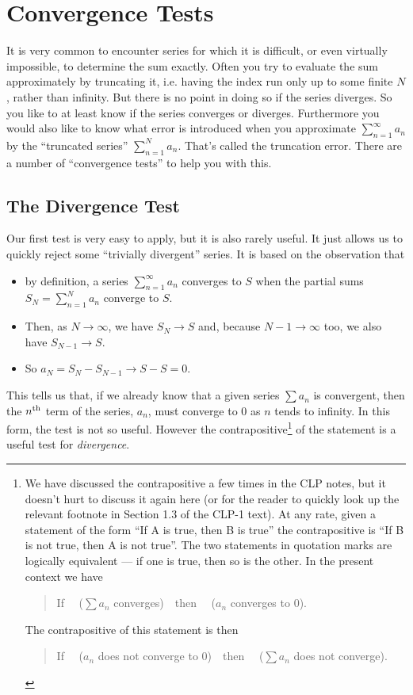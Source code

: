 \section{Convergence Tests}

It is very common to encounter series for which it is difficult, or even
virtually impossible, to determine the sum exactly. Often you try to evaluate
the sum approximately by truncating it, i.e. having the index run only
up to some finite $N$, rather than infinity. But there is no point in doing
so if the series diverges. So you like to at least know if the series converges
or diverges. Furthermore you would also like to know what error is introduced
when you approximate $\sum_{n=1}^\infty a_n$ by the ``truncated series''
$\sum_{n=1}^Na_n$. That's called the truncation error. There are a number
of ``convergence tests'' to help you with this.

\subsection{The Divergence Test}

Our first test is very easy to apply, but it is also rarely useful.
It just allows us to quickly reject some ``trivially divergent'' series.
It is based on the observation that
\begin{itemize}
\item  by definition, a series $\sum_{n=1}^\infty a_n$
converges to $S$ when the partial sums $S_N=\sum_{n=1}^N a_n$ converge
to  $S$.
\item Then, as $N\rightarrow\infty$, we have $S_N\rightarrow S$ and,
because $N-1\rightarrow\infty$ too, we also have $S_{N-1}\rightarrow S$.
\item
So $a_N=S_N-S_{N-1}\rightarrow S-S=0$.
\end{itemize}
This tells us that, if we already know that a given series $\sum a_n$
is convergent, then the $n^{\rm th}$ term of the series, $a_n$,
must converge to $0$ as $n$ tends to infinity. In this form,
the test is not so useful. However the
contrapositive\footnote{We have discussed the contrapositive a few times
in the CLP notes, but it doesn't hurt to discuss it again here (or for
the reader to quickly look up the relevant footnote in Section 1.3 of
the CLP-1 text).
At any rate, given a statement of the form ``If A is true, then B is true''
the contrapositive is ``If B is not true, then A is not true''.
The two statements in quotation marks are logically equivalent ---
if one is true, then so is the other. In the present context we have
\begin{quote}
 If \ \ ($\sum a_n$ converges)\ \  then \ \ ($a_n$ converges to $0$).
\end{quote}
The contrapositive of this statement is then
\begin{quote}
 If  \ \ ($a_n$ does not converge to 0)\ \  then
   \ \ ($\sum a_n$ does not converge).
\end{quote}
} of the statement is a useful test for \emph{divergence}.

